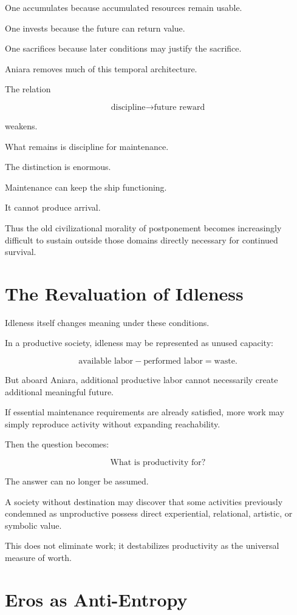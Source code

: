 \documentclass[11pt,oneside]{book}
\theoremstyle{definition}
\theoremstyle{remark}
\begin{document}
One accumulates because accumulated resources remain usable.

One invests because the future can return value.

One sacrifices because later conditions may justify the sacrifice.

Aniara removes much of this temporal architecture.

The relation

\[
\text{discipline}
\rightarrow
\text{future reward}
\]

weakens.

What remains is discipline for maintenance.

The distinction is enormous.

Maintenance can keep the ship functioning.

It cannot produce arrival.

Thus the old civilizational morality of postponement becomes increasingly difficult to sustain outside those domains directly necessary for continued survival.

\section{The Revaluation of Idleness}

Idleness itself changes meaning under these conditions.

In a productive society, idleness may be represented as unused capacity:

\[
\text{available labor}
-
\text{performed labor}
=
\text{waste}.
\]

But aboard Aniara, additional productive labor cannot necessarily create additional meaningful future.

If essential maintenance requirements are already satisfied, more work may simply reproduce activity without expanding reachability.

Then the question becomes:

\[
\text{What is productivity for?}
\]

The answer can no longer be assumed.

A society without destination may discover that some activities previously condemned as unproductive possess direct experiential, relational, artistic, or symbolic value.

This does not eliminate work; it destabilizes productivity as the universal measure of worth.

\section{Eros as Anti-Entropy}
\end{document}
